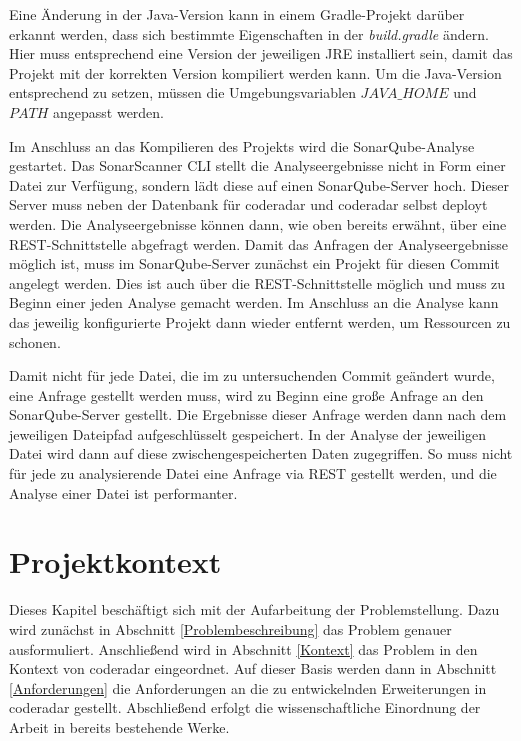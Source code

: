 \documentclass[
	oneside,  %
	ngerman, 
	final, 
	11pt, 
	a4paper, 
	1.1headlines, 
	headinclude=false, 
	footinclude=false, 
	mpinclude=false, 
	pagesize, 
	onecolumn, 
	titlepage, 
	parskip=half, 
	headsepline, 
	chapterprefix=false, 
	version=first, 
	listof=totoc, 
	bibliography=totoc, 
	toc=graduated, 
	fleqn
]{scrbook}
\begin{document}
Eine Änderung in der Java-Version kann in einem Gradle-Projekt darüber erkannt werden, dass sich bestimmte Eigenschaften in der \textit{build.gradle} ändern.
Hier muss entsprechend eine Version der jeweiligen \acs{JRE} installiert sein, damit das Projekt mit der korrekten Version kompiliert werden kann.
Um die Java-Version entsprechend zu setzen, müssen die Umgebungsvariablen \textit{$JAVA\_HOME$} und \textit{$PATH$} angepasst werden.

Im Anschluss an das Kompilieren des Projekts wird die SonarQube-Analyse gestartet.
Das SonarScanner \acs{CLI} stellt die Analyseergebnisse nicht in Form einer Datei zur Verfügung, sondern lädt diese auf einen SonarQube-Server hoch.
Dieser Server muss neben der Datenbank für coderadar und coderadar selbst deployt werden.
Die Analyseergebnisse können dann, wie oben bereits erwähnt, über eine \acs{REST}-Schnittstelle abgefragt werden.
Damit das Anfragen der Analyseergebnisse möglich ist, muss im SonarQube-Server zunächst ein Projekt für diesen Commit angelegt werden.
Dies ist auch über die \acs{REST}-Schnittstelle möglich und muss zu Beginn einer jeden Analyse gemacht werden.
Im Anschluss an die Analyse kann das jeweilig konfigurierte Projekt dann wieder entfernt werden, um Ressourcen zu schonen.

Damit nicht für jede Datei, die im zu untersuchenden Commit geändert wurde, eine Anfrage gestellt werden muss, wird zu Beginn eine große Anfrage an den SonarQube-Server gestellt.
Die Ergebnisse dieser Anfrage werden dann nach dem jeweiligen Dateipfad aufgeschlüsselt gespeichert.
In der Analyse der jeweiligen Datei wird dann auf diese zwischengespeicherten Daten zugegriffen.
So muss nicht für jede zu analysierende Datei eine Anfrage via \acs{REST} gestellt werden, und die Analyse einer Datei ist performanter.


\chapter{Projektkontext}
\label{Projektkontext}
Dieses Kapitel beschäftigt sich mit der Aufarbeitung der Problemstellung.
Dazu wird zunächst in Abschnitt \ref{Problembeschreibung} das Problem genauer ausformuliert.
Anschließend wird in Abschnitt \ref{Kontext} das Problem in den Kontext von coderadar eingeordnet.
Auf dieser Basis werden dann in Abschnitt \ref{Anforderungen} die Anforderungen an die zu entwickelnden Erweiterungen in coderadar gestellt.
Abschließend erfolgt die wissenschaftliche Einordnung der Arbeit in bereits bestehende Werke.
\end{document}
